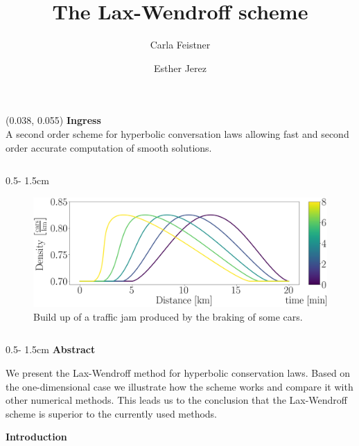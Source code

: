\documentclass{uibposter}
\title{The Lax-Wendroff scheme}
\author
{%
    Carla Feistner 
    \and
    Esther Jerez
}
\institute
{
    Department of mathematics -- University of Bergen
}
\begin{document}
\begin{textblock}{0.5}(0.038, 0.055)
    \color{white}
    \sffamily
    \textbf{Ingress}
    \\
A second order scheme for hyperbolic conversation laws allowing fast and second order accurate computation of smooth solutions. 
\end{textblock}

\begin{frame}[fragile]

\begin{columns}
\begin{column}{0.5\textwidth - 1.5cm}
    \begin{figure}[h]
    \includegraphics[width=\textwidth]{fig/traffic_motivation_laxW_continous.png} \caption{Build up of a traffic jam produced by the braking of some cars.} \label{img:traffic_flow_motivation}	
    \end{figure}
    \vspace{0.5cm}

\begin{column}{0.5\textwidth - 1.5cm}
\textbf{Abstract}
\vspace{0.5cm}

{\fontsize{40}{15}\selectfont
	We present the Lax-Wendroff method for hyperbolic conservation laws. Based on the one-dimensional case we illustrate how the scheme works and compare it with other numerical methods. This leads us to the conclusion that the Lax-Wendroff scheme is superior to the currently used methods.}

\vspace{0.5cm}
\textbf{Introduction}
\vspace{0.5cm}


\end{column}
\end{column}
\end{columns}
\end{frame}
\end{document}
